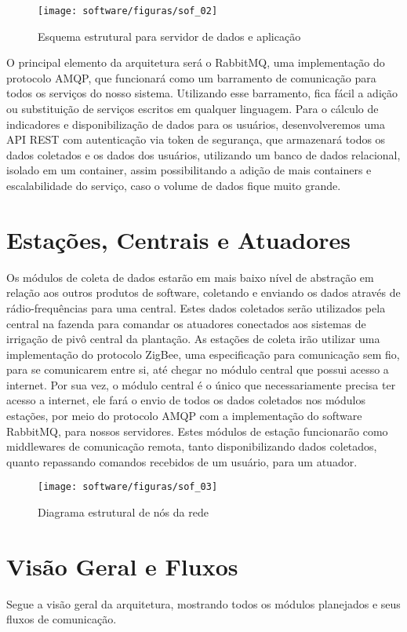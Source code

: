 \begin{figure}[H]
	\centering
	\texttt{[image: software/figuras/sof\_02]}
	\caption{Esquema estrutural para servidor de dados e aplicação}
\end{figure}

O principal elemento da arquitetura será o RabbitMQ, uma implementação do protocolo AMQP, que funcionará como um barramento de comunicação para todos os serviços do nosso sistema. Utilizando esse barramento, fica fácil a adição ou substituição de serviços escritos em qualquer linguagem.
Para o cálculo de indicadores e disponibilização de dados para os usuários, desenvolveremos uma API REST com autenticação via token de segurança, que armazenará todos os dados coletados e os dados dos usuários, utilizando um banco de dados relacional, isolado em um container, assim possibilitando a adição de mais containers e escalabilidade do serviço, caso o volume de dados fique muito grande.

\section{Estações, Centrais e Atuadores}
	Os módulos de coleta de dados estarão em mais baixo nível de abstração em relação aos outros produtos de software, coletando e enviando os dados através de rádio-frequências para uma central. Estes dados coletados serão utilizados pela central na fazenda para comandar os atuadores conectados aos sistemas de irrigação de pivô central da plantação. 
As estações de coleta irão utilizar uma implementação do protocolo ZigBee, uma especificação para comunicação sem fio, para se comunicarem entre si, até chegar no módulo central que possui acesso a internet.
Por sua vez, o módulo central é o único que necessariamente precisa ter acesso a internet, ele fará o envio de todos os dados coletados nos módulos estações, por meio do protocolo AMQP com a implementação do software RabbitMQ, para nossos servidores.
Estes módulos de estação funcionarão como middlewares de comunicação remota, tanto disponibilizando dados coletados, quanto repassando comandos recebidos de um usuário, para um atuador.

\begin{figure}[H]
	\centering
	\texttt{[image: software/figuras/sof\_03]}
	\caption{Diagrama estrutural de nós da rede}
\end{figure}




\section{Visão Geral e Fluxos}
	Segue a visão geral da arquitetura, mostrando todos os módulos planejados e seus fluxos de comunicação.



